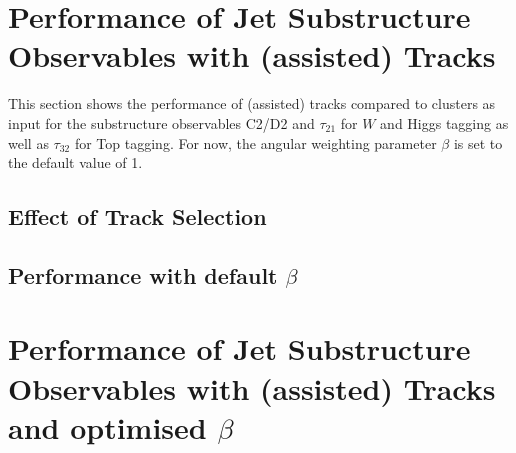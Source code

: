 \documentclass[UKenglish,texlive=2013]{\ATLASLATEXPATH atlasdoc}
\begin{document}
\section{Performance of Jet Substructure Observables with (assisted) Tracks}\label{sec:def_beta}
This section shows the performance of (assisted) tracks compared to clusters as input for the substructure observables C2/D2 and $\tau_{21}$ for $W$ and Higgs tagging as well as $\tau_{32}$ for Top tagging. For now, the angular weighting parameter $\beta$ is set to the default value of 1.
\subsection{Effect of Track Selection}


\subsection{Performance with default $\beta$}


\clearpage
\newpage
\section{Performance of Jet Substructure Observables with (assisted) Tracks and optimised $\beta$}\label{sec:beta_opt}


\end{document}
